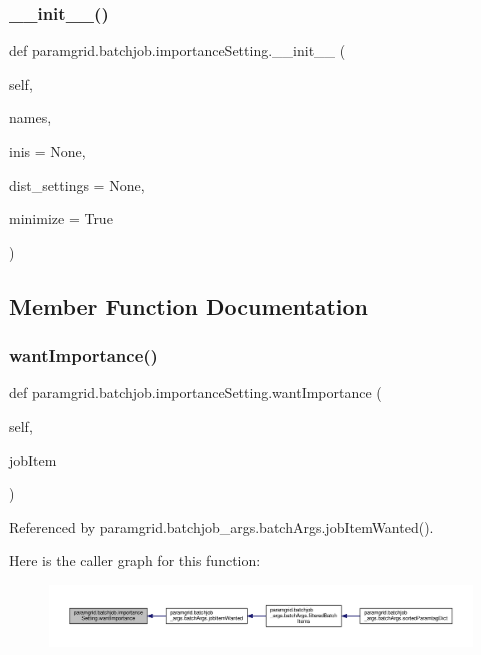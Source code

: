 \subsubsection{\texorpdfstring{\+\_\+\+\_\+init\+\_\+\+\_\+()}{\_\_init\_\_()}}
{\footnotesize\ttfamily def paramgrid.\+batchjob.\+importance\+Setting.\+\_\+\+\_\+init\+\_\+\+\_\+ (\begin{DoxyParamCaption}\item[{}]{self,  }\item[{}]{names,  }\item[{}]{inis = {\ttfamily None},  }\item[{}]{dist\+\_\+settings = {\ttfamily None},  }\item[{}]{minimize = {\ttfamily True} }\end{DoxyParamCaption})}



\subsection{Member Function Documentation}
\mbox{\label{classparamgrid_1_1batchjob_1_1importanceSetting_ad12747e01c947baffedfb12fd51a58d3}} 
\subsubsection{\texorpdfstring{want\+Importance()}{wantImportance()}}
{\footnotesize\ttfamily def paramgrid.\+batchjob.\+importance\+Setting.\+want\+Importance (\begin{DoxyParamCaption}\item[{}]{self,  }\item[{}]{job\+Item }\end{DoxyParamCaption})}



Referenced by paramgrid.\+batchjob\+\_\+args.\+batch\+Args.\+job\+Item\+Wanted().

Here is the caller graph for this function\+:
\nopagebreak
\begin{figure}[H]
\begin{center}
\leavevmode
\includegraphics[width=350pt]{classparamgrid_1_1batchjob_1_1importanceSetting_ad12747e01c947baffedfb12fd51a58d3_icgraph}
\end{center}
\end{figure}


